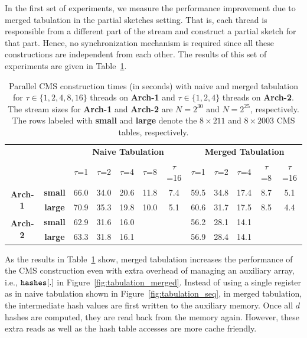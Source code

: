 \documentclass[10pt, conference, compsocconf]{IEEEtran}
\begin{document}
In the first set of experiments, we measure the performance improvement due to merged tabulation in the partial sketches setting. That is, each thread is responsible from a different part of the stream and construct a partial sketch for that part. Hence, no synchronization mechanism is required since all these constructions are independent from each other. The results of this set of experiments are given in Table~\ref{tbl:mergedtbl}. 

\begin{table}[htbp]
\centering
{\def\arraystretch{1.3}
\begin{tabular}{cc||ccccc|ccccc}
                                 &                 & \multicolumn{5}{c|}{\textbf{Naive Tabulation}} & \multicolumn{5}{c}{\textbf{Merged Tabulation}} \\
                                   &                 & $\tau$=1   & $\tau$=2    & $\tau$=4    & $\tau$=8    & $\tau$=16  & $\tau$=1   & $\tau$=2   & $\tau$=4   & $\tau$=8   & $\tau$=16 \\ \hline
\multirow{2}{*}{\textbf{Arch-1}} & \textbf{small}  & 66.0    & 34.0   & 20.6   & 11.8   & 7.4   & 59.5    & 34.8    & 17.4   & 8.7   & 5.1   \\
                                 & \textbf{large} & 70.9    & 35.3   & 19.8   &   10.0 & 5.1   &  60.6 &	31.7 &	17.5	& 8.5	& 4.4 \\ \hline
\multirow{2}{*}{\textbf{Arch-2}} & \textbf{small}  & 62.9    & 31.6   & 16.0   &        &       &  56.2    &  28.1   & 14.1   &        &       \\
                                 & \textbf{large} &  63.3      &   31.8     &       16.1 &        &       &     56.9    &     28.4    &     14.1   &        &      
\end{tabular}
}
\caption{Parallel CMS construction times (in seconds) with naive and merged tabulation for $\tau \in \{1, 2, 4, 8, 16\}$ threads on \textbf{Arch-1} and  $\tau \in \{1, 2, 4\}$ threads on \textbf{Arch-2}. The stream sizes for \textbf{Arch-1} and \textbf{Arch-2} are $N = 2^{30}$ and $N = 2^{25}$, respectively. The rows labeled with {\bf small} and {\bf large} denote the $8 \times 211$ and $8 \times 2003$ CMS tables, respectively. } \label{tbl:mergedtbl}

\end{table}

As the results in Table~\ref{tbl:mergedtbl} show, merged tabulation increases the performance of the CMS construction even with extra overhead of managing an auxiliary array, i.e., $\tt hashes[.]$ in Figure~\ref{fig:tabulation_merged}. Instead of using a single register as in naive tabulation shown in Figure~\ref{fig:tabulation_seq}, in merged tabulation, the intermediate hash values are first written to the auxiliary memory. Once all $d$ hashes are computed, they are read back from the memory again. However, these extra reads as well as the hash table accesses are more cache friendly.
\end{document}

